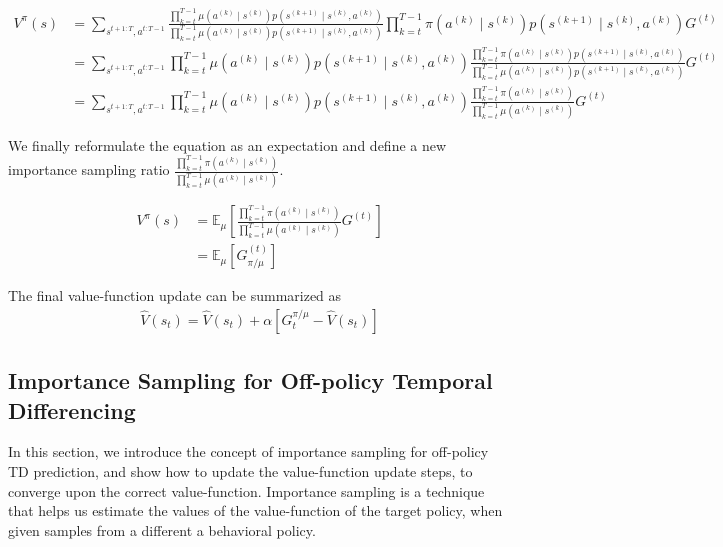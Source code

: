 \documentclass[11pt]{article}
\begin{document}
\begin{align} 
V^{\pi}(s) 
&=\sum_{s^{t+1: T}, a^{t: T-1}} \frac{\prod_{k=t}^{T-1} \mu\left(a^{(k)} \mid s^{(k)}\right) p\left(s^{(k+1)} \mid s^{(k)}, a^{(k)}\right)}{\prod_{k=t}^{T-1} \mu\left(a^{(k)} \mid s^{(k)}\right) p\left(s^{(k+1)} \mid s^{(k)}, a^{(k)}\right)} \prod_{k=t}^{T-1} \pi\left(a^{(k)} \mid s^{(k)}\right) p\left(s^{(k+1)} \mid s^{(k)}, a^{(k)}\right) G^{(t)} \\
&=\sum_{s^{t+1: T}, a^{t: T-1}} \prod_{k=t}^{T-1} \mu\left(a^{(k)} \mid s^{(k)}\right) p\left(s^{(k+1)} \mid s^{(k)}, a^{(k)}\right) \frac{\prod_{k=t}^{T-1} \pi\left(a^{(k)} \mid s^{(k)}\right) p\left(s^{(k+1)} \mid s^{(k)}, a^{(k)}\right)}{\prod_{k=t}^{T-1} \mu\left(a^{(k)} \mid s^{(k)}\right) p\left(s^{(k+1)} \mid s^{(k)}, a^{(k)}\right)} G^{(t)} \\
&=\sum_{s^{t+1: T}, a^{t: T-1}} \prod_{k=t}^{T-1} \mu\left(a^{(k)} \mid s^{(k)}\right) p\left(s^{(k+1)} \mid s^{(k)}, a^{(k)}\right) \frac{\prod_{k=t}^{T-1} \pi\left(a^{(k)} \mid s^{(k)}\right)}{\prod_{k=t}^{T-1} \mu\left(a^{(k)} \mid s^{(k)}\right)} G^{(t)}
\end{align}

We finally reformulate the equation as an expectation and define a new importance sampling ratio $\frac{\prod_{k=t}^{T-1} \pi\left(a^{(k)} \mid s^{(k)}\right)}{\prod_{k=t}^{T-1} \mu\left(a^{(k)} \mid s^{(k)}\right)}$.

\begin{align} 
V^{\pi}(s) 
&=\mathbb{E}_{\mu}\left[\frac{\prod_{k=t}^{T-1} \pi\left(a^{(k)} \mid s^{(k)}\right)}{\prod_{k=t}^{T-1} \mu\left(a^{(k)} \mid s^{(k)}\right)} G^{(t)}\right] \\
&=\mathbb{E}_{\mu}\left[G_{\pi / \mu}^{(t)}\right]
\end{align}

The final value-function update can be summarized as 
\begin{align}
    \hat{V} (s_{t})=\hat{V} \left(s_{t}\right)+\alpha\left[G_{t}^{\pi / \mu}-\hat{V} (s_{t})\right]
\end{align}

\subsection{Importance Sampling for Off-policy Temporal Differencing}
In this section, we introduce the concept of importance sampling for off-policy TD prediction, and show how to update the value-function update steps, to converge upon the correct value-function. Importance sampling is a technique that helps us estimate the values of the value-function of the target policy, when given samples from a different a behavioral policy.
\end{document}
